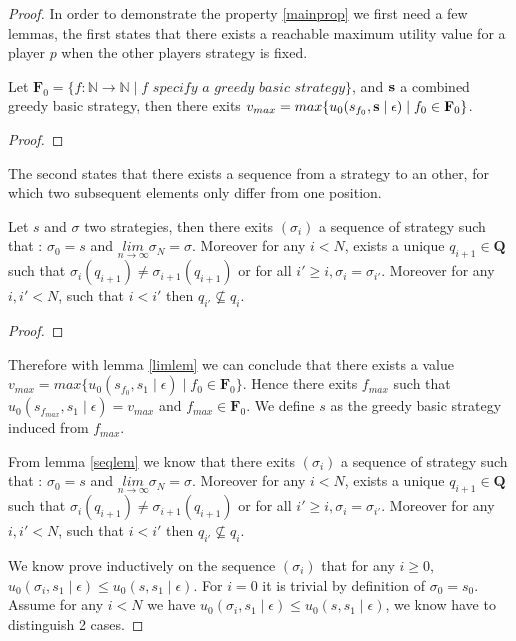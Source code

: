 \documentclass[11pt]{article}
\begin{document}
\begin{proof}

In order to demonstrate the property \ref{mainprop} we first need a few lemmas, the first states that there exists a reachable maximum utility value for a player $p$ when the other players strategy is fixed.
\begin{mylem}
\label{limlem}
Let $\mathbf{F}_0 = \{f : \mathbb{N} \rightarrow \mathbb{N} \mid f \textit{ specify a greedy basic strategy} \}$, and $\mathbf{s}$ a combined greedy basic strategy,
then there exits $v_{max} = max \{u_0(s_{f_0},\mathbf{s} \mid \epsilon) \mid f_0 \in \mathbf{F}_0 \}$.
\end{mylem}
\begin{proof}
\end{proof}

The second states that there exists a sequence from a strategy to an other, for which two subsequent elements only differ from one position.

\begin{mylem}
\label{seqlem}
Let $s$ and $\sigma$ two strategies, then
there exits $(\sigma_i)$ a sequence of strategy such that : $\sigma_0 = s$ and $\underset{n\rightarrow \infty}{lim}\sigma_N = \sigma$. Moreover for any $i < N$, exists a unique $q_{i+1} \in \mathbf{Q}$ such that $\sigma_{i}(q_{i+1}) \neq \sigma_{i+1}(q_{i+1})$ or for all $i' \geq i, \sigma_{i} = \sigma_{i'}$. Moreover for any $i,i' < N$, such that $i < i'$ then $q_{i'} \not \subseteq q_{i}$.
\end{mylem}
\begin{proof}
\end{proof}

Therefore with lemma \ref{limlem} we can conclude that there exists a value $v_{max} = max \{u_0(s_{f_0},s_1 \mid \epsilon) \mid f_0 \in \mathbf{F}_0 \}$. Hence there exits $f_{max}$ such that $u_0(s_{f_{max}},s_1\mid \epsilon) = v_{max}$ and $f_{max} \in \mathbf{F}_0$. We define $s$ as the greedy basic strategy induced from $f_{max}$.

From lemma \ref{seqlem} we know that there exits $(\sigma_i)$ a sequence of strategy such that : $\sigma_0 = s$ and $\underset{n\rightarrow \infty}{lim}\sigma_N = \sigma$. Moreover for any $i < N$, exists a unique $q_{i+1} \in \mathbf{Q}$ such that $\sigma_{i}(q_{i+1}) \neq \sigma_{i+1}(q_{i+1})$ or for all $i' \geq i, \sigma_{i} = \sigma_{i'}$. Moreover for any $i,i' < N$, such that $i < i'$ then $q_{i'} \not \subseteq q_{i}$.


We know prove inductively on the sequence $(\sigma_i)$ that for any $i \geq 0$, $u_0(\sigma_i,s_1 \mid \epsilon) \leq u_0(s,s_1 \mid \epsilon)$. For $i = 0$ it is trivial by definition of $\sigma_0 = s_0$.
Assume for any $i < N$ we have $u_0(\sigma_i,s_1 \mid \epsilon) \leq u_0(s,s_1 \mid \epsilon)$, we know have to distinguish 2 cases.


\end{proof}
\end{document}
